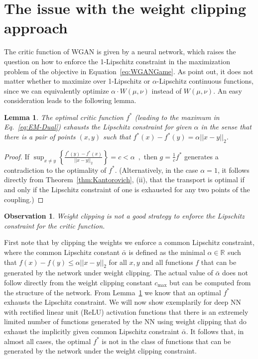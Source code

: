 \documentclass{article} %
\newcommand{\RR}[1][]{\mathbb{R}^{#1}}
\newcommand{\norm}[1]{||{#1}||_2}
\newtheorem{observation}{Observation}
\newtheorem{lemma}{Lemma}
\begin{document}
\section{The issue with the weight clipping approach} \label{appendix:weightClipping}

The critic function of WGAN is %
given by a neural network, which raises the question on how to enforce the 1-Lipschitz constraint in the maximization problem of the objective in Equation~\eqref{eq:WGANGame}. As  \citet{WGAN} point out, it does not matter whether to maximize over 1-Lipschitz or ${\alpha}$-Lipschitz continuous functions, since we can equivalently optimize $\alpha \cdot W(\mu, \nu)$ instead of $ W(\mu, \nu)$. An easy consideration leads to the following lemma.
\begin{lemma}\label{lma:One}
The optimal critic function $f^*$ (leading to the maximum in Eq.~\eqref{eq:EM-Dual}) exhausts the Lipschitz constraint for given $\alpha$ in the sense that there is a pair of points $(x,y)$ such that $f^*(x)-f^*(y)=\alpha\norm{x-y}$.
\end{lemma}
\begin{proof}
If 
$\sup_{x\neq y} \left \{ \frac{ f^*(y)-f^*(x)}{\norm{x-y}}\right \} =c< \alpha \enspace ,$ then $g= \frac{1}{c}f^*$ generates a contradiction to the optimality of $f^*$. (Alternatively, in the case $\alpha=1$, it follows directly from
Theorem~\ref{thm:Kantorovich}, (ii),
that the transport is optimal if and only if the Lipschitz constraint of one is exhausted for any two points of the coupling.)
\end{proof}



\begin{observation}
Weight clipping is not a good strategy to enforce the Lipschitz constraint for the critic function.
\end{observation}




First note that by clipping the weights we enforce a common Lipschitz constraint, where the common Lipschitz constant $\bar{\alpha}$ is defined as the minimal $\alpha\in \RR$ such that $f(x)-f(y)\leq \alpha \norm{x-y}$ for all $x,y$ and all functions $f$ that can be generated by the network under weight clipping. The actual value of $\bar{\alpha}$ does not follow directly from the weight clipping constant $c_{\text{max}}$ but can be computed from the structure of the network. From Lemma~\ref{lma:One} we know that an optimal $f^*$ exhausts the Lipschitz constraint. We will now show exemplarily for deep NN with rectified linear unit (ReLU) activation functions that there is an extremely limited number of functions generated by the NN using weight clipping that do exhaust the implicitly given common Lipschitz constraint $\bar{\alpha}$. It follows that, in almost all cases, the optimal $f^*$ is not in the class of functions that can be generated by the network under the weight clipping constraint.
\end{document}
